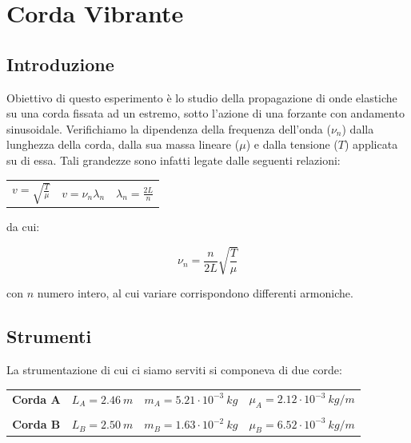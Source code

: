 \chapter{Corda Vibrante}

\section{Introduzione}

Obiettivo di questo esperimento è lo studio della propagazione di onde elastiche su una corda fissata ad un estremo, sotto l'azione di una forzante con andamento sinusoidale. Verifichiamo la dipendenza della frequenza dell'onda ($\nu_n$) dalla lunghezza della corda, dalla sua massa lineare ($\mu$) e dalla tensione ($T$) applicata su di essa. Tali grandezze sono infatti legate dalle seguenti relazioni:

\begin{center}
\begin{tabular}{c c c}
$
v= \sqrt{\frac{T}{\mu}} 
$
&
\hspace{1cm}
$
v= \nu_{n} \lambda_n
$ 
&
\hspace{1cm}
$
\lambda_n= \frac{2L}{n} 
$
\\
\end{tabular}
\end{center}

da cui:

\begin{equation}\label{frequenza}
\nu_n=\frac{n}{2L}\sqrt{\frac{T}{\mu}}
\end{equation}

con $n$ numero intero, al cui variare corrispondono differenti armoniche.


\section{Strumenti}

La strumentazione di cui ci siamo serviti si componeva di due corde:\\

\begin{tabular}{c c c c}
\textbf{Corda A} & \hspace{1cm} $L_A= 2.46\ m$ & \hspace{1cm} $m_A=5.21\cdot10^{-3}\ kg$ & \hspace{1cm} $\mu_A= 2.12\cdot10^{-3}\ kg/m$\\
\\
\textbf{Corda B} & \hspace{1cm} $L_B= 2.50\ m$ & \hspace{1cm} $m_B=1.63\cdot10^{-2}\ kg$ & \hspace{1cm} $\mu_B= 6.52\cdot10^{-3}\ kg/m$\\
\end{tabular} 
\\

